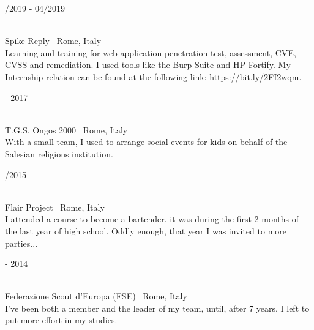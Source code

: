 \begin{minipage}{.3\textwidth}
	/2019 - 04/2019 \faCalendar
\end{minipage}
\hfill
\begin{minipage}{.65\textwidth}
	\vfill
	 \\
	\color{Maroon} Spike Reply \color{Sepia} \hfill \faMapMarker \ Rome, Italy
	\smallskip
	\\
	\color{gray} Learning and training for web application penetration test, assessment, CVE, CVSS and remediation. I used tools like the Burp Suite and HP Fortify. My Internship relation can be found at the following link: \url{https://bit.ly/2FI2wqm}.
	\vfill
\end{minipage}

\bigskip

\begin{minipage}{.3\textwidth}
	 - 2017 \faCalendar
\end{minipage}
\hfill
\begin{minipage}{.65\textwidth}
	\vfill
	 \\
	\color{Maroon} T.G.S. Ongos 2000 \color{Sepia} \hfill \faMapMarker \ Rome, Italy
	\smallskip
	\\
	\color{gray} With a small team, I used to arrange social events for kids on behalf of the Salesian religious institution. 
	\vfill
\end{minipage}

\bigskip

\begin{minipage}{.3\textwidth}
	/2015 \faCalendar
\end{minipage}
\hfill
\begin{minipage}{.65\textwidth}
	\vfill
	 \\
	\color{Maroon} Flair Project \color{Sepia} \hfill \faMapMarker \ Rome, Italy
	\smallskip
	\\
	\color{gray} I attended a course to become a bartender. it was during the first 2 months of the last year of high school. Oddly enough, that year I was invited to more parties...
	\vfill
\end{minipage}

\bigskip

\begin{minipage}{.3\textwidth}
	 - 2014 \faCalendar
\end{minipage}
\hfill
\begin{minipage}{.64\textwidth}
	\vfill
	 \\
	\color{Maroon} Federazione Scout d'Europa (FSE) \color{Sepia} \hfill \faMapMarker \ Rome, Italy
	\smallskip
	\\
	\color{gray} I've been both a member and the leader of my team, until, after 7 years, I left to put more effort in my studies.
	\vfill
\end{minipage}